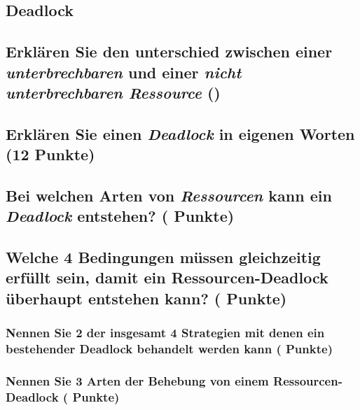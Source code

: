 \documentclass[9pt]{article}
\begin{document}
\bigskip
\begin{center}
  \begin{minipage}{0.9\linewidth}
    \section{Deadlock}
    \subsection{Erklären Sie den unterschied zwischen einer \textsl{unterbrechbaren} und einer \textsl{nicht unterbrechbaren Ressource} ()}
	\vspace{25mm}	
    \subsection{Erklären Sie einen \textsl{Deadlock} in eigenen Worten (12 Punkte)}
\vspace{65mm}
    \subsection{Bei welchen Arten von \textsl{Ressourcen} kann ein \textsl{Deadlock} entstehen? ( Punkte)}
\end{minipage}
\newpage
  \begin{minipage}{0.9\linewidth}
    \subsection{Welche 4 Bedingungen müssen gleichzeitig erfüllt sein, damit ein Ressourcen-Deadlock überhaupt entstehen kann? ( Punkte)}
    \vspace{25mm}
    \subsubsection{Nennen Sie 2 der insgesamt 4 Strategien mit denen ein bestehender Deadlock behandelt werden kann ( Punkte)}
    \vspace{15mm}
    \subsubsection{Nennen Sie 3 Arten der Behebung von einem Ressourcen-Deadlock ( Punkte)}
  \end{minipage}
\end{center}
\vspace{25mm}
\end{document}
